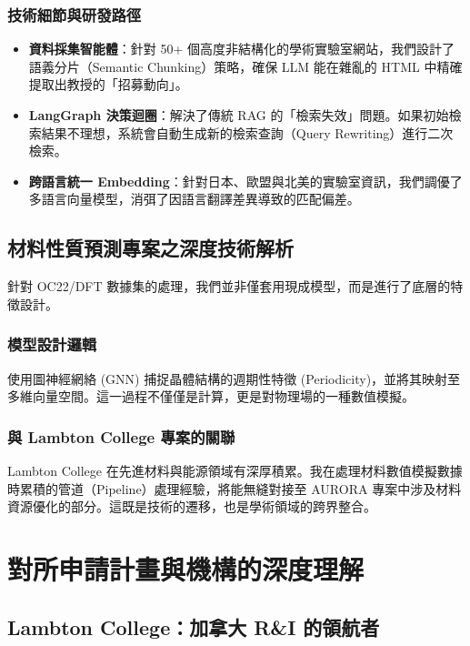 \documentclass[12pt,a4paper]{article}
\begin{document}
\subsubsection{技術細節與研發路徑}
\begin{itemize}
    \item \textbf{資料採集智能體}：針對 50+ 個高度非結構化的學術實驗室網站，我們設計了語義分片（Semantic Chunking）策略，確保 LLM 能在雜亂的 HTML 中精確提取出教授的「招募動向」。
    \item \textbf{LangGraph 決策迴圈}：解決了傳統 RAG 的「檢索失效」問題。如果初始檢索結果不理想，系統會自動生成新的檢索查詢（Query Rewriting）進行二次檢索。
    \item \textbf{跨語言統一 Embedding}：針對日本、歐盟與北美的實驗室資訊，我們調優了多語言向量模型，消弭了因語言翻譯差異導致的匹配偏差。
\end{itemize}

\newpage

\subsection{材料性質預測專案之深度技術解析}

針對 OC22/DFT 數據集的處理，我們並非僅套用現成模型，而是進行了底層的特徵設計。

\subsubsection{模型設計邏輯}
使用圖神經網絡 (GNN) 捕捉晶體結構的週期性特徵 (Periodicity)，並將其映射至多維向量空間。這一過程不僅僅是計算，更是對物理場的一種數值模擬。

\subsubsection{與 Lambton College 專案的關聯}
Lambton College 在先進材料與能源領域有深厚積累。我在處理材料數值模擬數據時累積的管道（Pipeline）處理經驗，將能無縫對接至 AURORA 專案中涉及材料資源優化的部分。這既是技術的遷移，也是學術領域的跨界整合。

\newpage

\newpage

\section{對所申請計畫與機構的深度理解}

\subsection{Lambton College：加拿大 R\&I 的領航者}
\end{document}
